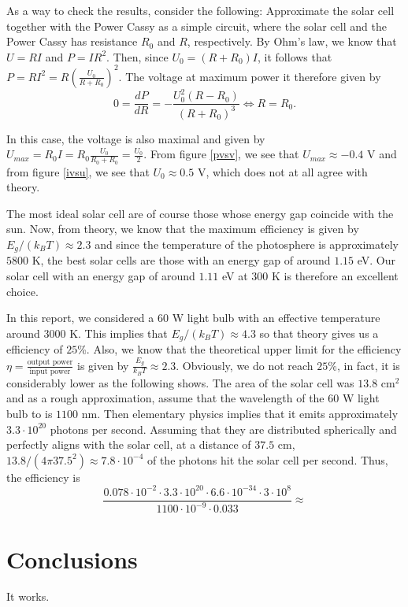 \documentclass[a4paper]{article}
\begin{document}
As a way to check the results, consider the following: Approximate the solar cell together with the Power Cassy as a simple circuit, where the solar cell and the Power Cassy has resistance $R_0$ and $R$, respectively. 
By Ohm's law, we know that $U=RI$ and $P=IR^2$. Then, since $U_0=(R+R_0)I$, it follows that $P=RI^2=R\left( \frac{U_0}{R+R_0} \right)^2$.
The voltage at maximum power it therefore given by
\begin{displaymath}
  0=\frac{dP}{dR}=-\frac{U_0^2(R-R_0)}{(R+R_0)^3}\iff R=R_0.
\end{displaymath}

In this case, the voltage is also maximal and given by $U_{max}=R_0I=R_0\frac{U_0}{R_0+R_0}=\frac{U_0}{2}$.
From figure \ref{pvsv}, we see that $U_{max}\approx -0.4$ V and from figure \ref{ivsu}, we see that $U_0\approx 0.5$ V, which does not at all agree with theory.

The most ideal solar cell are of course those whose energy gap coincide with the sun. Now, from theory, we know that the maximum efficiency is given by $E_g/(k_BT)\approx 2.3$ and since the temperature of the photosphere is approximately $5800$ K, the best solar cells are those with an energy gap of around $1.15$ eV.
Our solar cell with an energy gap of around $1.11$ eV at $300$ K is therefore an excellent choice.

In this report, we considered a $60$ W light bulb with an effective temperature around $3000$ K. This implies that $E_g/(k_B T)\approx 4.3$ so that theory gives us a efficiency of $25$\%.
Also, we know that the theoretical upper limit for the efficiency $\eta=\frac{\text{output power}}{\text{input power}}$ is given by $\frac{E_g}{k_B T}\approx 2.3$.
Obviously, we do not reach $25$\%, in fact, it is considerably lower as the following shows.
The area of the solar cell was $13.8$ cm${}^2$ and as a rough approximation, assume that the wavelength of the $60$ W light bulb to is $1100$ nm. Then elementary physics implies that it emits approximately $3.3\cdot 10^{20}$ photons per second. Assuming that they are distributed spherically and perfectly aligns with the solar cell, at a distance of $37.5$ cm, $13.8/(4\pi 37.5^2)\approx 7.8\cdot 10^{-4}$ of the photons hit the solar cell per second.
Thus, the efficiency is 
\begin{displaymath}
\frac{0.078\cdot 10^{-2}\cdot 3.3\cdot 10^{20}\cdot 6.6\cdot 10^{-34}\cdot 3\cdot 10^8}{1100\cdot 10^{-9}\cdot 0.033 }\approx
\end{displaymath}

\section{Conclusions}

It works.
\end{document}
